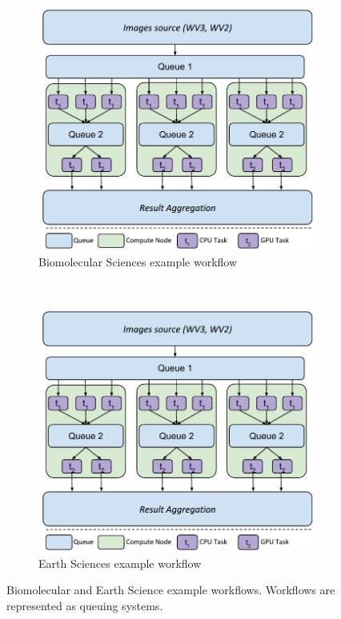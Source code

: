 \begin{figure}[ht!]
    \centering
    \begin{subfigure}[b]{0.45\textwidth}
        \includegraphics[width=\linewidth]{figures/SealsDesign2.pdf}
        \caption{Biomolecular Sciences example workflow}
        \label{fig:bio_workflow}
    \end{subfigure}%
    ~ 
    \begin{subfigure}[b]{0.45\textwidth}
        \includegraphics[width=\linewidth]{figures/SealsDesign2.pdf}
        \caption{Earth Sciences example workflow}
        \label{fig:earth_workflow}
    \end{subfigure}
    \caption{Biomolecular and Earth Science example workflows. Workflows are represented as queuing systems.}\label{fig:bio_earth_workflows}
\end{figure}

